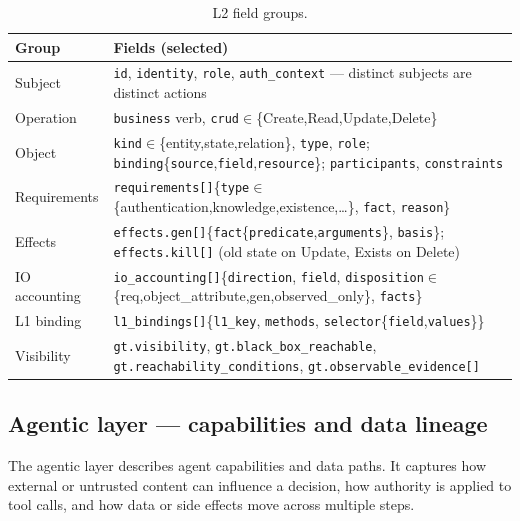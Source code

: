 \documentclass[11pt,a4paper]{article}
\newcommand{\cd}[1]{\lstinline[basicstyle=\ttfamily\small]|#1|}
\begin{document}
\begin{table}[ht]\centering\small
\caption{L2 field groups.}\label{tab:l2}
\begin{tabularx}{\textwidth}{@{}l>{\raggedright\arraybackslash}X@{}}
\toprule
\textbf{Group} & \textbf{Fields (selected)}\\
\midrule
Subject       & \cd{id}, \cd{identity}, \cd{role}, \cd{auth_context} --- distinct subjects are distinct actions\\
Operation     & \cd{business} verb, \cd{crud}$\in$\{Create,Read,Update,Delete\}\\
Object        & \cd{kind}$\in$\{entity,state,relation\}, \cd{type}, \cd{role}; \cd{binding}\{\cd{source},\cd{field},\cd{resource}\}; \cd{participants}, \cd{constraints}\\
Requirements  & \cd{requirements[]}\{\cd{type}$\in$\{authentication,knowledge,existence,\dots\}, \cd{fact}, \cd{reason}\}\\
Effects       & \cd{effects.gen[]}\{\cd{fact}\{\cd{predicate},\cd{arguments}\}, \cd{basis}\}; \cd{effects.kill[]} (old state on Update, Exists on Delete)\\
IO accounting & \cd{io_accounting[]}\{\cd{direction}, \cd{field}, \cd{disposition}$\in$\{req,object\_attribute,gen,observed\_only\}, \cd{facts}\}\\
L1 binding    & \cd{l1_bindings[]}\{\cd{l1_key}, \cd{methods}, \cd{selector}\{\cd{field},\cd{values}\}\}\\
Visibility    & \cd{gt.visibility}, \cd{gt.black_box_reachable}, \cd{gt.reachability_conditions}, \cd{gt.observable_evidence[]}\\
\bottomrule
\end{tabularx}
\end{table}

\subsection{Agentic layer --- capabilities and data lineage}
The agentic layer describes agent capabilities and data paths. It captures how external
or untrusted content can influence a decision, how authority is applied to tool calls,
and how data or side effects move across multiple steps.
\end{document}
